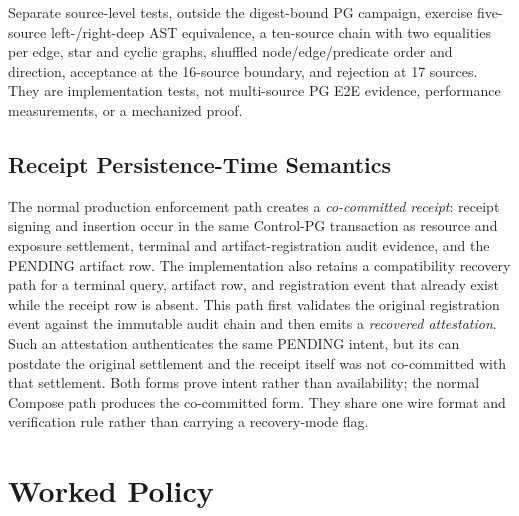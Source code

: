 \documentclass[journal,onecolumn]{IEEEtran}
\newcommand{\code}[1]{\texttt{\detokenize{#1}}}
\begin{document}
Separate source-level tests, outside the digest-bound PG campaign, exercise
five-source left-/right-deep AST equivalence, a ten-source chain with two
equalities per edge, star and cyclic graphs, shuffled node/edge/predicate order
and direction, acceptance at the 16-source boundary, and rejection at 17
sources.  They are implementation tests, not
multi-source PG E2E evidence, performance measurements, or a mechanized proof.

\subsection{Receipt Persistence-Time Semantics}

The normal production enforcement path creates a \emph{co-committed receipt}: receipt
signing and insertion occur in the same Control-PG transaction as resource and
exposure settlement, terminal and artifact-registration audit evidence, and
the PENDING artifact row.  The implementation also retains a compatibility
recovery path for a terminal query, artifact row, and registration event that
already exist while the receipt row is absent.  This path first validates the
original registration event against the immutable audit chain and then emits a
\emph{recovered attestation}. Such an attestation authenticates the same
PENDING intent, but its \code{signed_at} can postdate the original
settlement and the receipt itself was not co-committed with that settlement.
Both forms prove intent rather than availability; the normal Compose path
produces the co-committed form. They share one wire format and verification
rule rather than carrying a recovery-mode flag.

\section{Worked Policy}
\label{sec:worked-policy-supp}
\end{document}
